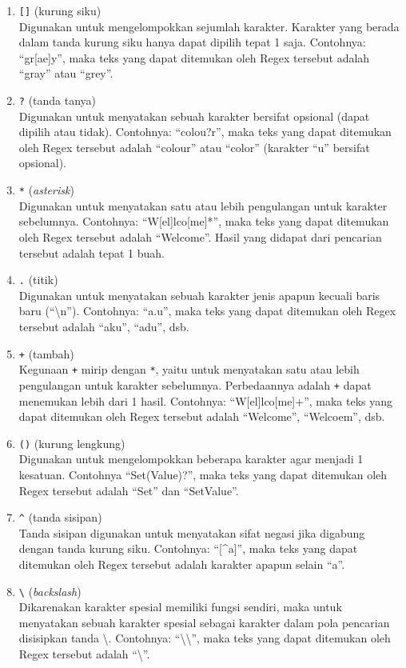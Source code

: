 \begin{enumerate}
	\item \texttt{[]} (kurung siku)\\
	Digunakan untuk mengelompokkan sejumlah karakter. Karakter yang berada dalam tanda kurung siku hanya dapat dipilih tepat 1 saja. Contohnya: ``gr[ae]y'', maka teks yang dapat ditemukan oleh Regex tersebut adalah ``gray'' atau ``grey''.
	\item \texttt{?} (tanda tanya)\\
	Digunakan untuk menyatakan sebuah karakter bersifat opsional (dapat dipilih atau tidak). Contohnya: ``colou?r'', maka teks yang dapat ditemukan oleh Regex tersebut adalah ``colour'' atau ``color'' (karakter ``u'' bersifat opsional).
	\item \texttt{*} (\textit{asterisk})\\
	Digunakan untuk menyatakan satu atau lebih pengulangan untuk karakter sebelumnya. Contohnya: ``W[el]lco[me]*'', maka teks yang dapat ditemukan oleh Regex tersebut adalah ``Welcome''. Hasil yang didapat dari pencarian tersebut adalah tepat 1 buah.
	\item \texttt{.} (titik)\\
	Digunakan untuk menyatakan sebuah karakter jenis apapun kecuali baris baru (``\textbackslash n''). Contohnya: ``a.u'', maka teks yang dapat ditemukan oleh Regex tersebut adalah ``aku'', ``adu'', dsb.
	\item \texttt{+} (tambah)\\
	Kegunaan \texttt{+} mirip dengan \texttt{*}, yaitu untuk menyatakan satu atau lebih pengulangan untuk karakter sebelumnya. Perbedaannya adalah \texttt{+} dapat menemukan lebih dari 1 hasil. Contohnya: ``W[el]lco[me]+'', maka teks yang dapat ditemukan oleh Regex tersebut adalah ``Welcome'', ``Welcoem'', dsb.
	\item \texttt{()} (kurung lengkung)\\
	Digunakan untuk mengelompokkan beberapa karakter agar menjadi 1 kesatuan. Contohnya ``Set(Value)?'', maka teks yang dapat ditemukan oleh Regex tersebut adalah ``Set'' dan ``SetValue''.
	\item \texttt{\textasciicircum} (tanda sisipan)\\
	Tanda sisipan digunakan untuk menyatakan sifat negasi jika digabung dengan tanda kurung siku. Contohnya: ``[\textasciicircum a]'', maka teks yang dapat ditemukan oleh Regex tersebut adalah karakter apapun selain ``a''.
	\item \texttt{\textbackslash} (\textit{backslash})\\
	Dikarenakan karakter spesial memiliki fungsi sendiri, maka untuk menyatakan sebuah karakter spesial sebagai karakter dalam pola pencarian disisipkan tanda \textbackslash. Contohnya: ``\textbackslash\textbackslash'', maka teks yang dapat ditemukan oleh Regex tersebut adalah ``\textbackslash''.
\end{enumerate}

